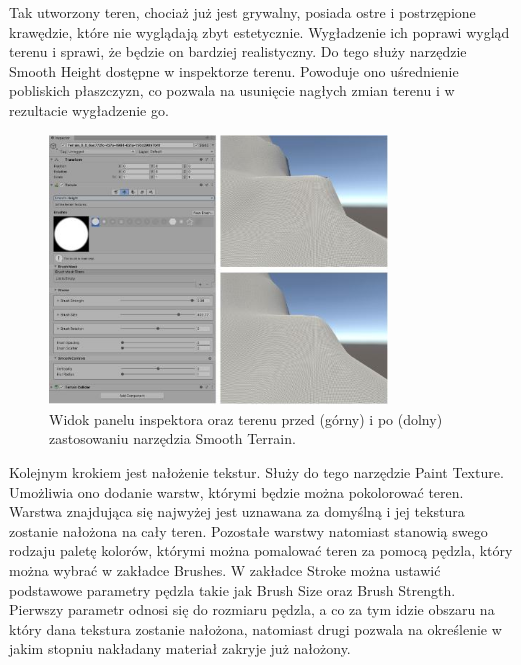 Tak utworzony teren, chociaż już jest grywalny, posiada ostre i postrzępione krawędzie, które nie wyglądają zbyt estetycznie. Wygładzenie ich poprawi wygląd terenu i sprawi, że będzie on bardziej realistyczny. Do tego służy narzędzie Smooth Height dostępne w inspektorze terenu. Powoduje ono uśrednienie pobliskich płaszczyzn, co pozwala na usunięcie nagłych zmian terenu i w rezultacie wygładzenie go.

\begin{figure}[htbp]
    \centering
    \includegraphics[width=0.8\textwidth]{images/modelowanie_terenu/rzezbienie.jpg}
    \caption{Widok panelu inspektora oraz terenu przed (górny) i po (dolny) zastosowaniu narzędzia Smooth Terrain.}\label{fig:rzezbienie_terenu}
\end{figure}

Kolejnym krokiem jest nałożenie tekstur. Służy do tego narzędzie Paint Texture. Umożliwia ono dodanie warstw, którymi będzie można pokolorować teren. Warstwa znajdująca się najwyżej jest uznawana za domyślną i jej tekstura zostanie nałożona na cały teren. Pozostałe warstwy natomiast stanowią swego rodzaju paletę kolorów, którymi można pomalować teren za pomocą pędzla, który można wybrać w zakładce Brushes. W zakładce Stroke można ustawić podstawowe parametry pędzla takie jak Brush Size oraz Brush Strength. Pierwszy parametr odnosi się do rozmiaru pędzla, a co za tym idzie obszaru na który dana tekstura zostanie nałożona, natomiast drugi pozwala na określenie w jakim stopniu nakładany materiał zakryje już nałożony.

